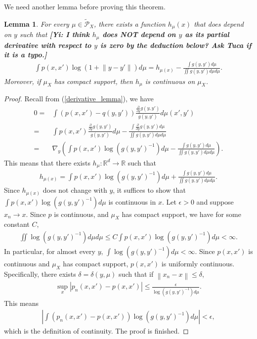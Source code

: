 \documentclass[10pt]{article}
\newcommand{\norm}[1]{\left\lVert#1\right\rVert}
\newcommand{\gy}[1]{\textbf{\color{red}[Yi: #1]}}
\newtheorem{lemma}{\bf Lemma}
\newenvironment{Proof of lemma}{\noindent{\bf Proof of Lemma}}{\hfill$\Box$\newline}
\newenvironment{Proof of claim}{\noindent{\bf Proof of claim}}{\hfill$\Box$\newline}
\newenvironment{Proof of theorem}{\noindent{\bf Proof of Theorem}}{\hfill\scriptsize{$\Box$}\newline}
\newenvironment{Proof of theorems}{\noindent{\bf Proof of Theorems}}{\hfill$\Box$\newline}
\newenvironment{Proof of proposition}{\noindent{\bf Proof of Proposition}}{\hfill$\Box$\newline}
\newenvironment{Proof of propositions}{\noindent{\bf Proof of Propositions}}{\hfill$\Box$\newline}
\newenvironment{Proof of exercise}{\noindent{\it Proof of Exercise:}}{\hfill$\Box$}
\numberwithin{equation}{section}
\begin{document}
We need another lemma before proving this theorem.
\begin{lemma} \label{home_stretch_lemma}
    For every $\mu \in \tilde{\mathcal{P}}_X$, there exists a function $h_{\mu}(x)$ that does depend on $y$ such that \gy{I think $h_{\mu}$ does NOT depend on $y$ as its partial derivative with respect to $y$ is zero by the deduction below? Ask Tuca if it is a typo.}
    \begin{align}
        \int p(x,x') \log(1+\norm{y-y'})d\mu = h_{\mu(x)} - \frac{\int g(y,y')d\mu}{\iint g(y,y')d\mu d\mu}.
    \end{align}
    Moreover, if $\mu_X$ has compact support, then $h_{\mu}$ is continuous on $\mu_X$.
\end{lemma}
\begin{proof}
    Recall from (\ref{derivative_lemma}), we have
    \begin{align}
        0 = & \int (p(x,x')-q(y,y')) \frac{\frac{\partial}{\partial y}g(y,y')}{g(y,y')} d\mu(x',y') \nonumber                                                               \\
        =   & \int p(x,x') \frac{\frac{\partial}{\partial y}g(y,y')}{g(y,y')} d \mu -  \frac{\int \frac{\partial}{\partial y}g(y,y')d\mu}{\iint g(y,y')d\mu d\mu} \nonumber \\
        =   & \nabla_y \left(\int p(x,x') \log (g(y,y')^{-1}) d \mu -  \frac{\int g(y,y')d\mu}{\iint g(y,y')d\mu d\mu}\right).
    \end{align}
    This means that there exists $h_{\mu}: \mathbb{R}^d \to \mathbb{R}$ such that
    \begin{align}
        h_{\mu(x)} = \int p(x,x') \log(g(y,y')^{-1})d\mu + \frac{\int g(y,y')d\mu}{\iint g(y,y')d\mu d\mu}.
    \end{align}
    Since $h_{\mu(x)}$ does not change with $y$, it suffices to show that $\int p(x,x') \log(g(y,y')^{-1})d\mu$ is continuous in $x$. Let $\epsilon>0$ and suppose $x_n \to x$. Since $p$ is continuous, and $\mu_X$ has compact support, we have for some constant $C$,
    \begin{align}
        \iint \log(g(y,y')^{-1})d\mu d\mu \leq C \int p(x,x') \log(g(y,y')^{-1})d\mu < \infty.
    \end{align}
    In particular, for almost every $y$, $\int \log(g(y,y')^{-1})d\mu < \infty$. Since $p(x,x')$ is continuous and $\mu_X$ has compact support, $p(x,x')$ is uniformly continuous. Specifically, there exists $\delta = \delta(y,\mu)$ such that if $\norm{x_n-x} \leq \delta$,
    \begin{align}
        \sup_x |p_n(x,x')-p(x,x')| \leq \frac{\epsilon}{\log(g(y,y')^{-1})d\mu}.
    \end{align}
    This means
    \begin{align}
        \left|\int(p_n(x,x')-p(x,x')) \log(g(y,y')^{-1})d \mu\right| < \epsilon,
    \end{align}
    which is the definition of continuity. The proof is finished.
\end{proof}
\end{document}
